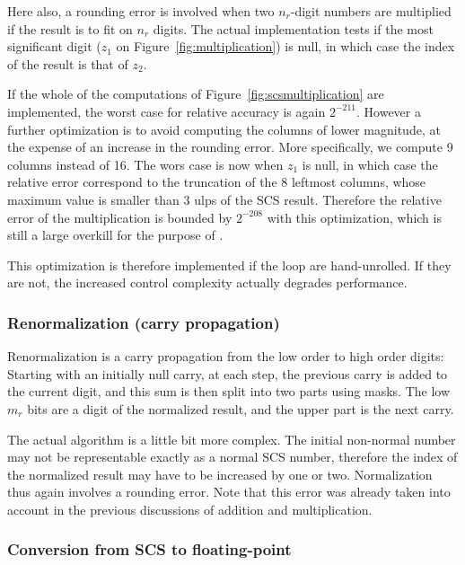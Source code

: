 Here also, a rounding error is involved when two $n_r$-digit numbers
are multiplied if the result is to fit on $n_r$ digits. The actual
implementation tests if the most significant digit ($z_1$ on
Figure~\ref{fig:multiplication}) is null, in which case the index of
the result is that of $z_2$.

If the whole of the computations of
Figure~\ref{fig:scsmultiplication} are implemented, the worst case
for relative accuracy is again $2^{-211}$. However a further
optimization is to avoid computing the columns of lower magnitude, at
the expense of an increase in the rounding error. More specifically,
we compute 9 columns instead of 16.  The wors case is now when $z_1$
is null, in which case the relative error correspond to the truncation
of the 8 leftmost columns, whose maximum value is smaller than 3 ulps
of the SCS result. Therefore the relative error of the multiplication
is bounded by $2^{-208}$ with this optimization, which is still a
large overkill for the purpose of \crlibm.

This optimization is therefore implemented if the loop are hand-unrolled.
If they are not, the increased control complexity actually degrades
performance.


\subsubsection{Renormalization (carry propagation) \label{renorm}}

Renormalization is a carry propagation from the low order to high
order digits: Starting with an initially null carry, at each step, the
previous carry is added to the current digit, and this sum is then
split into two parts using masks. The low $m_r$ bits are a digit of
the normalized result, and the upper part is the next carry.

The actual algorithm is a little bit more complex. The initial
non-normal number may not be representable exactly as a normal SCS
number, therefore the index of the normalized result may have to be
increased by one or two.  Normalization thus again involves a rounding
error. Note that this error was already taken into account in the previous
discussions of addition and multiplication.




\subsubsection{Conversion from SCS to floating-point}

